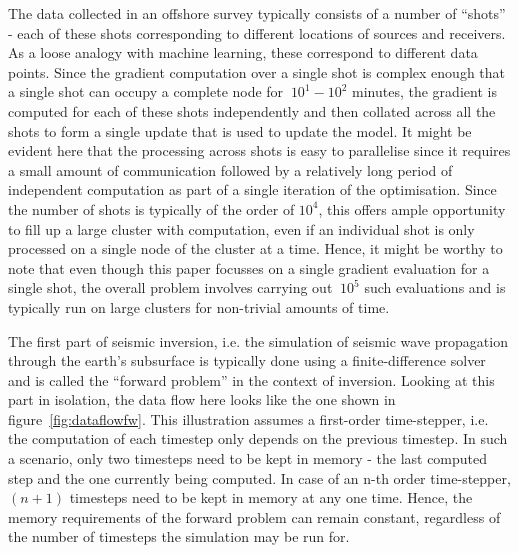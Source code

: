 The data collected in an offshore survey typically consists of a
number of ``shots'' - each of these shots corresponding to different
locations of sources and receivers. As a loose analogy with machine
learning, these correspond to different data points. Since the
gradient computation over a single shot is complex enough that a
single shot can occupy a complete node for $~10^1-10^2$ minutes, the gradient is computed for each of these
shots independently and then collated across all the shots to form a
single update that is used to update the model. It might be evident
here that the processing across shots is easy to parallelise since it
requires a small amount of communication followed by a relatively long
period of independent computation as part of a single iteration of the
optimisation. Since the number of shots is typically of the order of
$10^4$, this offers ample opportunity to fill up a large cluster with
computation, even if an individual shot is only processed on a single
node of the cluster at a time. Hence, it might be worthy to note that
even though this paper focusses on a single gradient evaluation for a
single shot, the overall problem involves carrying out $~10^5$ such
evaluations and is typically run on large clusters for non-trivial
amounts of time.

The first part of seismic inversion, i.e. the simulation of seismic
wave propagation through the earth's subsurface is typically done
using a finite-difference solver and is called the ``forward problem''
in the context of inversion. Looking at this part in isolation, the
data flow here looks like the one shown in
figure~\ref{fig:dataflowfw}. This illustration assumes a first-order
time-stepper, i.e. the computation of each timestep only depends on
the previous timestep. In such a scenario, only two timesteps need to
be kept in memory - the last computed step and the one currently being
computed. In case of an n-th order time-stepper, $(n+1)$ timesteps
need to be kept in memory at any one time. Hence, the memory
requirements of the forward problem can remain constant, regardless of
the number of timesteps the simulation may be run for.

\begin{figure*}
\begin{center}

\end{center}
\caption{The dataflow pattern typical of a forward-only
  simulation. Boxes represent data and arrows represent computation.}
\label{fig:dataflowfw}
\end{figure*}


